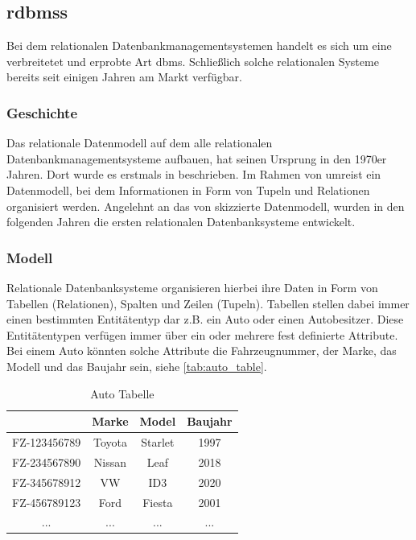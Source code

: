\subsection{\acl{rdbms}s}
Bei dem relationalen Datenbankmanagementsystemen handelt es sich um eine verbreitetet und erprobte Art \acs{dbms}. Schließlich solche relationalen Systeme bereits seit einigen Jahren am Markt verfügbar. 

\subsubsection{Geschichte}
Das relationale Datenmodell auf dem alle relationalen Datenbankmanagementsysteme aufbauen, hat seinen Ursprung in den 1970er Jahren. Dort wurde es erstmals in \cite{codd_relational_model} beschrieben. Im Rahmen von \cite{codd_relational_model} umreist \citeauthor{codd_relational_model} ein Datenmodell, bei dem Informationen in Form von Tupeln und Relationen organisiert werden. Angelehnt an das von \citeauthor{codd_relational_model} skizzierte Datenmodell, wurden in den folgenden Jahren die ersten relationalen Datenbanksysteme entwickelt. 

\subsubsection{Modell}
Relationale Datenbanksysteme organisieren hierbei ihre Daten in Form von Tabellen (Relationen), Spalten und Zeilen (Tupeln). Tabellen stellen dabei immer einen bestimmten Entitätentyp dar z.B. ein Auto oder einen Autobesitzer. Diese Entitätentypen verfügen immer über ein oder mehrere fest definierte Attribute. Bei einem Auto könnten solche Attribute die Fahrzeugnummer, der Marke, das Modell und das Baujahr sein, siehe \autoref{tab:auto_table}. 

\begin{table}[h]
    \centering
    \begin{tabular}{c|c|c|c}
    \hline
    \rowcolor[HTML]{EFEFEF} 
    \multicolumn{1}{l|}{\cellcolor[HTML]{EFEFEF}\textbf{Fahrzeugnummer}} & \multicolumn{1}{l|}{\cellcolor[HTML]{EFEFEF}\textbf{Marke}} & \multicolumn{1}{l|}{\cellcolor[HTML]{EFEFEF}\textbf{Model}} & \multicolumn{1}{l}{\cellcolor[HTML]{EFEFEF}\textbf{Baujahr}} \\ \hline
    FZ-123456789 & Toyota & Starlet & 1997 \\
    FZ-234567890 & Nissan & Leaf & 2018 \\
    FZ-345678912 & VW & ID3 & 2020 \\
    FZ-456789123 & Ford & Fiesta & 2001 \\
    ... & ... & ... & ... \\ \hline
    \end{tabular}
    \caption{Auto Tabelle}
    \label{tab:auto_table}
\end{table}


